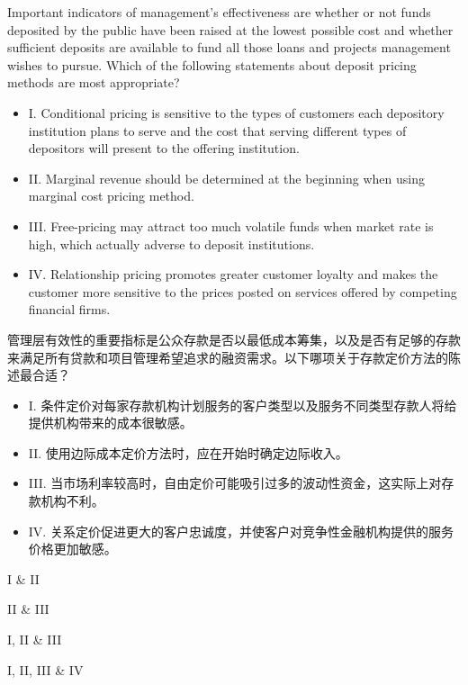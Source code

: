 \documentclass{article}
\newcounter{question} %
\begin{document}
\begin{question}
    Important indicators of management's effectiveness are whether or not funds deposited by the public have been raised at the lowest possible cost and whether sufficient deposits are available to fund all those loans and projects management wishes to pursue. Which of the following statements about deposit pricing methods are most appropriate?
    \begin{itemize}
        \item I. Conditional pricing is sensitive to the types of customers each depository institution plans to serve and the cost that serving different types of depositors will present to the offering institution.
        \item II. Marginal revenue should be determined at the beginning when using marginal cost pricing method.
        \item III. Free-pricing may attract too much volatile funds when market rate is high, which actually adverse to deposit institutions.
        \item IV. Relationship pricing promotes greater customer loyalty and makes the customer more sensitive to the prices posted on services offered by competing financial firms.
    \end{itemize}
    管理层有效性的重要指标是公众存款是否以最低成本筹集，以及是否有足够的存款来满足所有贷款和项目管理希望追求的融资需求。以下哪项关于存款定价方法的陈述最合适？
    \begin{itemize}
        \item I. 条件定价对每家存款机构计划服务的客户类型以及服务不同类型存款人将给提供机构带来的成本很敏感。
        \item II. 使用边际成本定价方法时，应在开始时确定边际收入。
        \item III. 当市场利率较高时，自由定价可能吸引过多的波动性资金，这实际上对存款机构不利。
        \item IV. 关系定价促进更大的客户忠诚度，并使客户对竞争性金融机构提供的服务价格更加敏感。
    \end{itemize}
\end{question}

\begin{choices}
    \item I \& II
    \item II \& III
    \item I, II \& III
    \item I, II, III \& IV
\end{choices}
\end{document}
